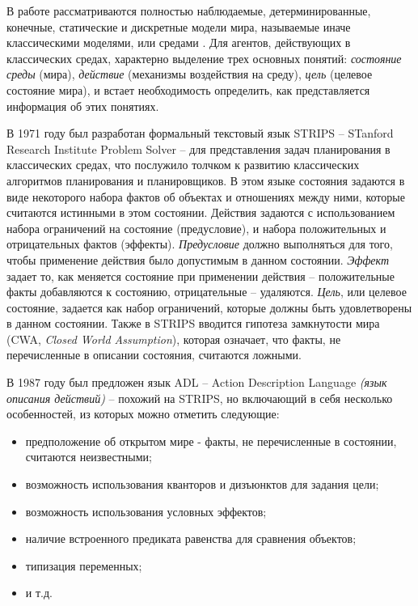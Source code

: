 \documentclass[a4paper,14pt]{extreport}
\begin{document}
	
	В работе рассматриваются полностью наблюдаемые, детерминированные, конечные, статические и дискретные модели мира, называемые иначе классическими моделями, или средами \cite{norwig-ai}. Для агентов, действующих в классических средах, характерно выделение трех основных понятий: \textit{состояние среды} (мира), \textit{действие} (механизмы воздействия на среду), \textit{цель} (целевое состояние мира), и встает необходимость определить, как представляется информация об этих понятиях. 
	
	В 1971 году был разработан формальный текстовый язык STRIPS \cite{strips} -- STanford Research Institute Problem Solver -- для представления задач планирования в классических средах, что послужило толчком к развитию классических алгоритмов планирования и планировщиков. В этом языке состояния задаются в виде некоторого набора фактов об объектах и отношениях между ними, которые считаются истинными в этом состоянии. Действия задаются с использованием набора ограничений на состояние (предусловие), и набора положительных и отрицательных фактов (эффекты). \textit{Предусловие} должно выполняться для того, чтобы применение действия было допустимым в данном состоянии. \textit{Эффект} задает то, как меняется состояние при применении действия -- положительные факты добавляются к состоянию, отрицательные -- удаляются. \textit{Цель}, или целевое состояние, задается как набор ограничений, которые должны быть удовлетворены в данном состоянии. Также в STRIPS вводится гипотеза замкнутости мира (CWA, \textit{Closed World Assumption}), которая означает, что факты, не перечисленные в описании состояния, считаются ложными.
	
	В 1987 году был предложен язык ADL -- Action Description Language \textit{(язык описания действий)} -- похожий на STRIPS, но включающий в себя несколько особенностей, из которых можно отметить следующие:
	\begin{itemize}
	    \item предположение об открытом мире - факты, не перечисленные в состоянии, считаются неизвестными;
	    \item возможность использования кванторов и дизъюнктов для задания цели;
	    \item возможность использования условных эффектов;
	    \item наличие встроенного предиката равенства для сравнения объектов;
	    \item типизация переменных;
	    \item и т.д.
	\end{itemize}
    
\end{document}

